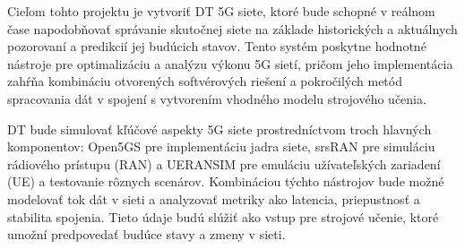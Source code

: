 \par{
Cieľom tohto projektu je vytvoriť DT 5G siete, ktoré bude schopné v reálnom čase napodobňovať správanie skutočnej siete na základe historických a aktuálnych pozorovaní a predikcií jej budúcich stavov. Tento systém poskytne hodnotné nástroje pre optimalizáciu a analýzu výkonu 5G sietí, pričom jeho implementácia zahŕňa kombináciu otvorených softvérových riešení a pokročilých metód spracovania dát v spojení s vytvorením vhodného modelu strojového učenia.
}

\par{
DT bude simulovať kľúčové aspekty 5G siete prostredníctvom troch hlavných komponentov: Open5GS pre implementáciu jadra siete, srsRAN pre simuláciu rádiového prístupu (RAN) a UERANSIM pre emuláciu užívateľských zariadení (UE) a testovanie rôznych scenárov. Kombináciou týchto nástrojov bude možné modelovať tok dát v sieti a analyzovať metriky ako latencia, priepustnosť a stabilita spojenia. Tieto údaje budú slúžiť ako vstup pre strojové učenie, ktoré umožní predpovedať budúce stavy a zmeny v sieti.
}

